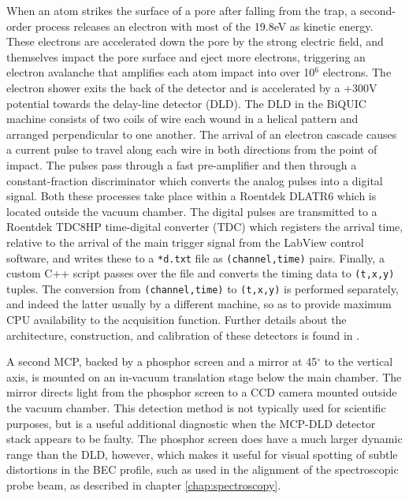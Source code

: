 	When an atom strikes the surface of a pore after falling from the trap, a second-order process releases an electron with most of the  19.8eV as kinetic energy\cite{ThatPaper}.
	These electrons are accelerated down the pore by the strong electric field, and themselves impact the pore surface and eject more electrons, triggering an electron avalanche that amplifies each atom impact into over 10$^6$ electrons.
	The electron shower exits the back of the detector and is accelerated by a +300V potential towards the delay-line detector (DLD).
	The DLD in the BiQUIC machine consists of two coils of wire each wound in a helical pattern and arranged perpendicular to one another.
	 The arrival of an electron cascade causes a current pulse to travel along each wire in both directions from the point of impact.
	The pulses pass through a fast pre-amplifier and then through a constant-fraction discriminator which converts the analog pulses into a digital signal.
	Both these processes take place within a Roentdek DLATR6 which is located outside the vacuum chamber.
	The digital pulses are transmitted to a Roentdek TDC8HP time-digital converter (TDC) which registers the arrival time, relative to the arrival of the main trigger signal from the LabView control software, and writes these to a \verb|*d.txt| file as \verb|(channel,time)| pairs.
	Finally, a custom C++ script passes over the file and converts the timing data to \verb|(t,x,y)| tuples.
	The conversion from \verb|(channel,time)| to \verb|(t,x,y)| is performed separately, and indeed the latter usually by a different machine, so as to provide maximum CPU availability to the acquisition function.	Further details about the architecture, construction, and calibration of these detectors is found in \cite{HodgmanThesis,ManningThesis}.

	A second MCP, backed by a phosphor screen and a mirror at 45$^\circ$ to the vertical axis, is mounted on an in-vacuum translation stage below the main chamber.
	The mirror directs light from the phosphor screen to a CCD camera mounted outside the vacuum chamber.
	This detection method is not typically used for scientific purposes, but is a useful additional diagnostic when the MCP-DLD detector stack appears to be faulty.
	The phosphor screen does have a much larger dynamic range than the DLD, however, which makes it useful for visual spotting of subtle distortions in the BEC profile, such as used in the alignment of the spectroscopic probe beam, as described in chapter \ref{chap:spectroscopy}.
	


